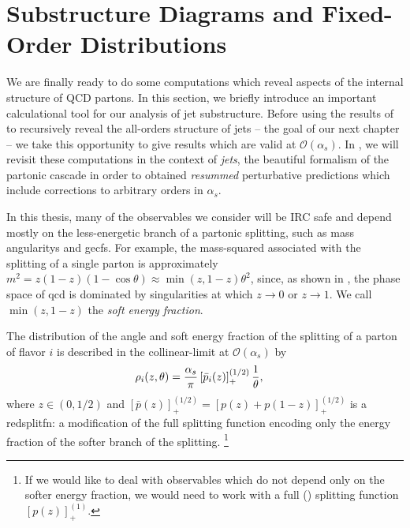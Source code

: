 \section{Substructure Diagrams and Fixed-Order Distributions}
\label{sec:fixed-order-substructure}

We are finally ready to do some computations which reveal aspects of the internal structure of QCD partons.
%
In this section, we briefly introduce an important calculational tool for our analysis of jet substructure.
%
Before using the results of  to recursively reveal the all-orders structure of jets -- the goal of our next chapter -- we take this opportunity to give results which are valid at \(\mathcal{O}(\alpha_s)\).
%
In , we will revisit these computations in the context of \textit{\glspl{jet}}, the beautiful formalism of the partonic cascade in order to obtained \textit{resummed} perturbative predictions which include corrections to arbitrary orders in \(\alpha_s\).


In this thesis, many of the observables we consider will be IRC safe and depend mostly on the less-energetic branch of a partonic splitting, such as mass \glspl{angularity} and \glspl{gecf}.
%
For example, the mass-squared associated with the splitting of a single parton is approximately \(m^2 = z(1-z)(1-\cos\theta) \approx \min(z, 1-z) \theta^2\), since, as shown in , the phase space of \gls{qcd} is dominated by singularities at which \(z\to 0\) or \(z \to 1\).
%
We call \(\min(z, 1-z)\) the \textit{soft energy fraction}.

The distribution of the angle and soft energy fraction of the splitting of a parton of flavor \(i\) is described in the \gls{collinear-limit} at \(\mathcal{O}(\alpha_s)\) by
%
\begin{align}
    \label{eq:emission-probability}
    \rho_{i}(z,\theta)
    &=
    \frac{\alpha_s}{\pi}
    \le[\bar{p}_i(z)\ri]^{(1/2)}_+ \frac{1}{\theta}
    ,
\end{align}
where \(z\in(0, 1/2)\) and \([\bar{p}(z)]^{(1/2)}_+ = [p(z) + p(1-z)]^{(1/2)}_+\) is a  \gls{redsplitfn}:
%
a modification of the full splitting function encoding only the energy fraction of the softer branch of the splitting.%
\footnote{
   If we would like to deal with observables which do not depend only on the softer energy fraction, we would need to work with a full () splitting function \([p(z)]^{(1)}_+\).
}

